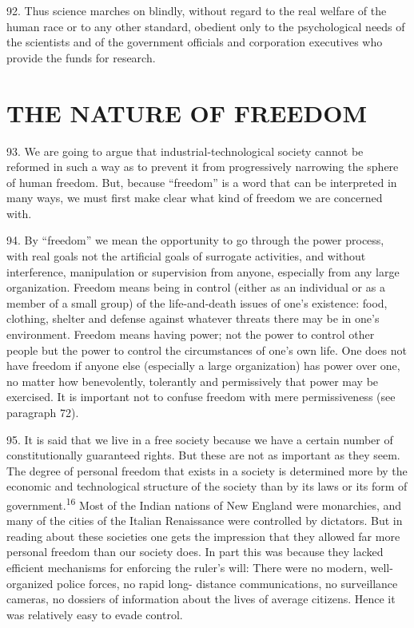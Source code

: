 \documentclass{article}
\begin{document}
92. Thus science marches on blindly, without regard to the real welfare of the human race or to 
any other standard, obedient only to the psychological needs of the scientists and of the government 
officials and corporation executives who provide the funds for research. 


\section{THE NATURE OF FREEDOM}

\hspace{0.5cm} 93. We are going to argue that industrial-technological society cannot be reformed in such a way 
as to prevent it from progressively narrowing the sphere of human freedom. But, because 
“freedom” is a word that can be interpreted in many ways, we must first make clear what kind of 
freedom we are concerned with. \vspace{\baselineskip}

94. By “freedom” we mean the opportunity to go through the power process, with real goals not 
the artificial goals of surrogate activities, and without interference, manipulation or supervision 
from anyone, especially from any large organization. Freedom means being in control (either as 
an individual or as a member of a small group) of the life-and-death issues of one’s existence: 
food, clothing, shelter and defense against whatever threats there may be in one’s 
environment. Freedom means having power; not the power to control other people but the power 
to control the circumstances of one’s own life. One does not have freedom if anyone else 
(especially a large organization) has power over one, no matter how benevolently, tolerantly and 
permissively that power may be exercised. It is important not to confuse freedom with mere 
permissiveness (see paragraph 72). \vspace{\baselineskip}

95. It is said that we live in a free society because we have a certain number of constitutionally 
guaranteed rights. But these are not as important as they seem. The degree of personal freedom 
that exists in a society is determined more by the economic and technological structure of the 
society than by its laws or its form of government.\textsuperscript{16} Most of the Indian nations of New England 
were monarchies, and many of the cities of the Italian Renaissance were controlled by dictators. But in reading about these societies one gets the impression that they allowed far more 
personal freedom than our society does. In part this was because they lacked efficient mechanisms 
for enforcing the ruler’s will: There were no modern, well-organized police forces, no rapid long-
distance communications, no surveillance cameras, no dossiers of information about the lives of 
average citizens. Hence it was relatively easy to evade control. \vspace{\baselineskip}
\end{document}
